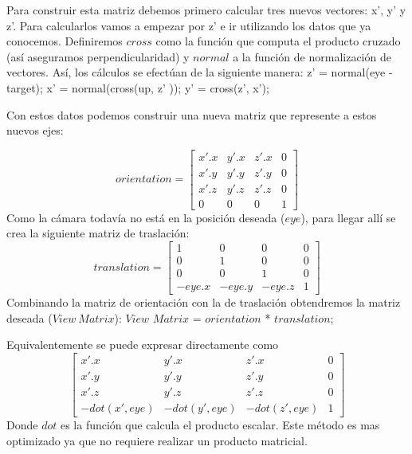 \documentclass[a4paper]{article}
\begin{document}
Para construir esta matriz debemos primero calcular tres nuevos vectores: x', y' y z'. Para calcularlos vamos a empezar por z' e ir utilizando los datos que ya conocemos. Definiremos $cross$ como la función que computa el producto cruzado (así aseguramos perpendicularidad) y $normal$ a la función de normalización de vectores. Así, los cálculos se efectúan de la siguiente manera: \newline \newline
    z'  = normal(eye - target); \newline 
    x' = normal(cross(up, z' )); \newline
    y' = cross(z', x');   \newline
 
Con estos datos podemos construir una nueva matriz que represente a estos nuevos ejes:


\[
orientation =
\begin{bmatrix}
x'.x & y'.x & z'.x & 0 \\
x'.y & y'.y & z'.y & 0 \\
x'.z & y'.z & z'.z & 0 \\
0 & 0 & 0 & 1      
\end{bmatrix} 
\]
Como la cámara todavía no está en la posición deseada ($eye$), para llegar allí se crea la siguiente matriz de traslación: \newline 
\[
translation =
\begin{bmatrix}
1 & 0 & 0 & 0 \\
0 & 1 & 0 & 0 \\ 
0 & 0 & 1 & 0 \\
-eye.x & -eye.y & -eye.z & 1 
\end{bmatrix}
\]
 Combinando la matriz de orientación con la de traslación obtendremos la matriz deseada ($View\ Matrix$):  \newline
  $View$ $Matrix$ = $orientation$ * $translation$;
  
  
Equivalentemente se puede expresar directamente como
\[
\begin{bmatrix}
x'.x & y'.x & z'.x & 0 \\ 
x'.y & y'.y & z'.y & 0 \\
x'.z & y'.z & z'.z & 0 \\
-dot(x', eye) & -dot(y', eye) & -dot(z', eye) & 1    
\end{bmatrix}
\]
Donde $dot$ es la función que calcula el producto escalar. Este método es mas optimizado ya que no requiere realizar un producto matricial.
\end{document}
